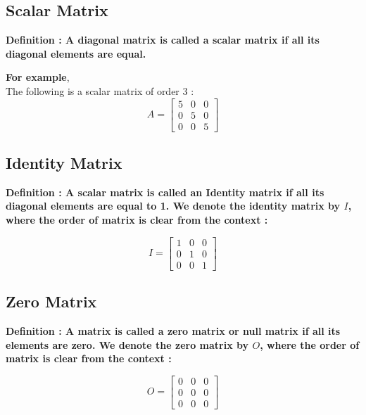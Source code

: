 \documentclass[12pt, letterpaper]{article}
\begin{document}
\subsection{Scalar Matrix}
\begin{displayquote}
\textbf{Definition : A diagonal matrix is called a scalar matrix if all its diagonal elements are equal.}
\end{displayquote}
\textbf{For example},\\
The following is a scalar matrix of order 3 : 
\begin{displaymath}
A = \begin{bmatrix}
5 & 0 & 0 \\
0 & 5 & 0 \\
0 & 0 & 5
\end{bmatrix}
\end{displaymath}

\subsection{Identity Matrix}
\begin{displayquote}
\textbf{Definition : A scalar matrix is called an Identity matrix if all its diagonal elements are equal to 1. We denote the identity matrix by $I$, where the order of matrix is clear from the context :}
\end{displayquote}
\begin{displaymath}
I = \begin{bmatrix}
1 & 0 & 0 \\
0 & 1 & 0 \\
0 & 0 & 1
\end{bmatrix}
\end{displaymath}

\subsection{Zero Matrix}
\begin{displayquote}
\textbf{Definition : A matrix is called a zero matrix or null matrix if all its elements are zero. We denote the zero matrix by $O$, where the order of matrix is clear from the context :}
\end{displayquote}
\begin{displaymath}
O = \begin{bmatrix}
0 & 0 & 0 \\
0 & 0 & 0 \\
0 & 0 & 0
\end{bmatrix}
\end{displaymath}
\end{document}
